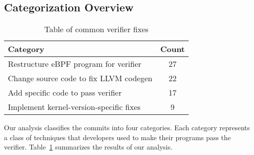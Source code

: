 \subsection{Categorization Overview}

\begin{table}[t]
    \small
    \centering
    \begin{tabular}{lc}%
        \toprule
        \textbf{Category} & \textbf{Count} \\
        \midrule
        Restructure eBPF program for verifier & 27 \\           %
        Change source code to fix LLVM codegen & 22 \\          %
        Add specific code to pass verifier & 17 \\              %
        Implement kernel-version-specific fixes & 9 \\          %
        \bottomrule
    \end{tabular}
    \caption{Table of common verifier fixes} %
    \label{fig:commit-table}
\end{table}

Our analysis classifies the commits into four categories.
Each category represents a class of techniques that developers used to make their programs pass the verifier.
Table~\ref{fig:commit-table} summarizes the results of our analysis.

